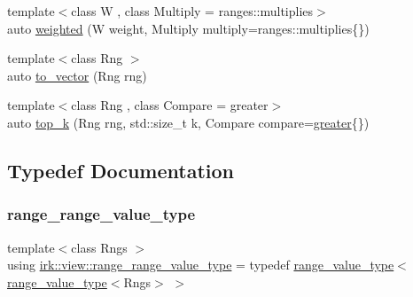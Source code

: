 \begin{DoxyCompactItemize}
\item 
{\footnotesize template$<$class W , class Multiply  = ranges\+::multiplies$>$ }\\auto \mbox{\hyperlink{namespaceirk_1_1view_ac30f787832859d974a3db71afa5c953f}{weighted}} (W weight, Multiply multiply=ranges\+::multiplies\{\})
\item 
{\footnotesize template$<$class Rng $>$ }\\auto \mbox{\hyperlink{namespaceirk_1_1view_a4c57f6b275583eb4259ab6adac064984}{to\+\_\+vector}} (Rng rng)
\item 
{\footnotesize template$<$class Rng , class Compare  = greater$>$ }\\auto \mbox{\hyperlink{namespaceirk_1_1view_a39f5f931fdce5219b2bd043175f1890c}{top\+\_\+k}} (Rng rng, std\+::size\+\_\+t k, Compare compare=\mbox{\hyperlink{structirk_1_1view_1_1greater}{greater}}\{\})
\end{DoxyCompactItemize}


\subsection{Typedef Documentation}
\mbox{\label{namespaceirk_1_1view_a1b371e0a4f94ed45f210d4fa3643214a}} 
\subsubsection{\texorpdfstring{range\+\_\+range\+\_\+value\+\_\+type}{range\_range\_value\_type}}
{\footnotesize\ttfamily template$<$class Rngs $>$ \\
using \mbox{\hyperlink{namespaceirk_1_1view_a1b371e0a4f94ed45f210d4fa3643214a}{irk\+::view\+::range\+\_\+range\+\_\+value\+\_\+type}} = typedef \mbox{\hyperlink{namespaceirk_1_1view_af4751010e3df5f2a3c2706fe12317fbd}{range\+\_\+value\+\_\+type}}$<$\mbox{\hyperlink{namespaceirk_1_1view_af4751010e3df5f2a3c2706fe12317fbd}{range\+\_\+value\+\_\+type}}$<$Rngs$>$ $>$}

\mbox{\label{namespaceirk_1_1view_af4751010e3df5f2a3c2706fe12317fbd}} 
